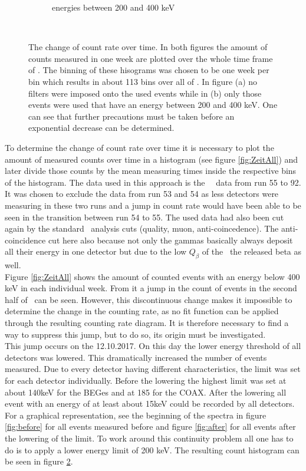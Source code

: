 \documentclass[encoding=utf8,british]{tumphthesis}
\begin{document}
\begin{figure}[t!]
\begin{subfigure}{.475\textwidth}
		\caption{energies between 200 and 400 keV}
		\label{fig:ZeitLimits}
	\end{subfigure}
    \\
    \caption{
    	The change of count rate over time.
    	In both figures the amount of counts measured in one week are plotted over the whole time frame of \PII. 
        The binning of these hisograms was chosen to be one week per bin which results in about 113 bins over all of  \PII.
    	In figure (a) no filters were imposed onto the used events while in (b) only those events were used that have an energy between 200 and 400 keV. 
    	One can see that further precautions must be taken before an exponential decrease can be determined. 
    	}
\end{figure}

To determine the change of count rate over time it is necessary to plot the amount of measured counts over time in a histogram (see figure \ref{fig:ZeitAll}) and later divide those counts by the mean measuring times inside the respective bins of the histogram.
The data used in this approach is the \gerda\ \PII\ data from run 55 to 92.
It was chosen to exclude the data from run 53 and 54 as less detectors were measuring in these two runs and a jump in count rate would have been able to be seen in the transition between run 54 to 55.
The used data had also been cut again by the standard \gerda\ analysis cuts (quality, muon, anti-coincedence).
The anti-coincidence cut here also because not only the gammas basically always deposit all their energy in one detector but due to the low  $Q_\beta$ of the \Kr\ the released beta as well.
 \\

Figure \ref{fig:ZeitAll} shows the amount of counted events with an energy below 400 keV in each individual week.
From it a jump in the count of events in the second half of \PII\ can be seen.
However, this discontinuous change makes it impossible to determine the change in the counting rate, as no fit function can be applied through the resulting counting rate diagram. 
It is therefore necessary to find a way to suppress this jump, but to do so, its origin must be investigated.
\\

This jump occurs on the 12.10.2017.
On this day the lower energy threshold of all detectors was lowered.
This dramatically increased the number of events measured.
Due to every detector having different characteristics, the limit was set for each detector individually.
Before the lowering the highest limit was set at about 140keV for the BEGes and at 185 for the COAX.
After the lowering all event with an energy of at least about 15keV could be recorded by all detectors.
For a graphical representation, see the beginning of the spectra in figure \ref{fig:before} for all events measured before and figure \ref{fig:after} for all events after the lowering of the limit. 
To work around this continuity problem all one has to do is to apply a lower energy limit of 200 keV.
The resulting count histogram can be seen in figure \ref{fig:ZeitLimits}.
\\
\end{document}
